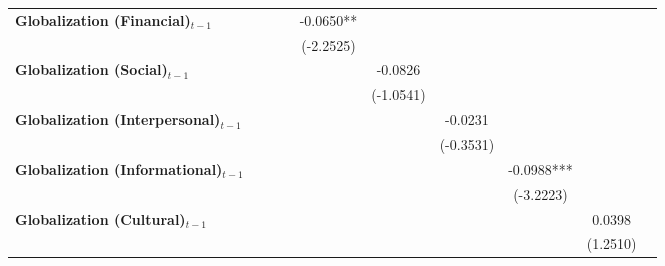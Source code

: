 \begin{center}
\begin{tabular}{lccccccccc}
\textbf{Globalization (Financial)$_{t-1}$}             &                    &                    &                    &     -0.0650**      &                    &                    &                    &                    &                     \\
\textbf{ }                         &                    &                    &                    &     (-2.2525)      &                    &                    &                    &                    &                     \\
\textbf{Globalization (Social)$_{t-1}$}             &                    &                    &                    &                    &      -0.0826       &                    &                    &                    &                     \\
\textbf{ }                         &                    &                    &                    &                    &     (-1.0541)      &                    &                    &                    &                     \\
\textbf{Globalization (Interpersonal)$_{t-1}$}             &                    &                    &                    &                    &                    &      -0.0231       &                    &                    &                     \\
\textbf{ }                         &                    &                    &                    &                    &                    &     (-0.3531)      &                    &                    &                     \\
\textbf{Globalization (Informational)$_{t-1}$}             &                    &                    &                    &                    &                    &                    &     -0.0988***     &                    &                     \\
\textbf{ }                         &                    &                    &                    &                    &                    &                    &     (-3.2223)      &                    &                     \\
\textbf{Globalization (Cultural)$_{t-1}$}             &                    &                    &                    &                    &                    &                    &                    &       0.0398       &                     \\
\textbf{ }                         &                    &                    &                    &                    &                    &                    &                    &      (1.2510)      &                     \\

\end{tabular}
\end{center}
